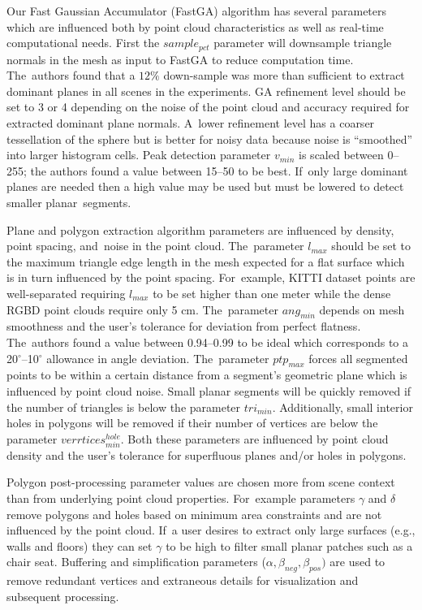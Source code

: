 Our Fast Gaussian Accumulator (FastGA) algorithm has several parameters which are influenced both by point cloud characteristics as well as real-time computational needs. First the $sample_{pct}$ parameter will downsample triangle normals in the mesh as input to FastGA to reduce computation time. The~authors found that a $12 \%$ down-sample was more than sufficient to extract dominant planes in all scenes in the experiments. GA refinement level should be set to 3 or 4 depending on the noise of the point cloud and accuracy required for extracted dominant plane normals. A~lower refinement level has a coarser tessellation of the sphere but is better for noisy data because noise is ``smoothed'' into larger histogram cells. Peak detection parameter $v_{min}$ is scaled between 0--255; the authors found a value between 15--50 to be best. If~only large dominant planes are needed then a high value may be used but must be lowered to detect smaller planar~segments.

Plane and polygon extraction algorithm parameters are influenced by  density, point spacing, and~noise in the point cloud. The~parameter $l_{max}$ should be set to the maximum triangle edge length in the mesh expected for a flat surface which is in turn influenced by the point spacing. For~example, KITTI dataset points are well-separated requiring $l_{max}$ to be set higher than one meter while the dense \ac{RGBD} point clouds require only 5 cm. The~parameter $ang_{min}$ depends on mesh smoothness and the user's tolerance for deviation from perfect flatness. The~authors found a value between 0.94--0.99 to be ideal which corresponds to a 20$^{\circ}$--10$^{\circ}$ allowance in angle deviation. The~parameter $ptp_{max}$ forces all segmented points to be within a certain distance from a segment's geometric plane which is influenced by point cloud noise. Small planar segments will be quickly removed if the number of triangles is below the parameter $tri_{min}$. Additionally, small interior holes in polygons will be removed if their number of vertices are below the parameter $verrtices^{hole}_{min}$. Both these parameters are influenced by point cloud density and the user's tolerance for superfluous planes and/or holes in polygons.

Polygon post-processing parameter values are chosen more from scene context than from underlying point cloud properties. For~example parameters $\gamma$ and $\delta$ remove polygons and holes based on minimum area constraints and are not influenced by the point cloud. If~a user desires to extract only large surfaces (e.g., walls and floors) they can set $\gamma$ to be high to filter small planar patches such as a chair seat. Buffering and simplification parameters ($\alpha, \beta_{neg}, \beta_{pos})$ are used to remove redundant vertices and extraneous details for visualization and subsequent processing.%

